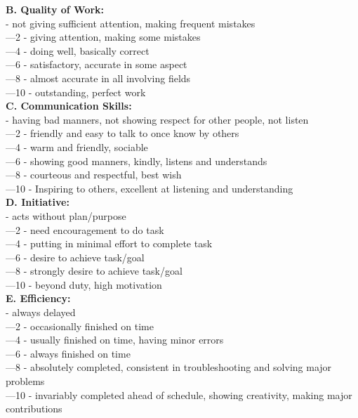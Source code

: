 \documentclass[11pt]{article}
\begin{document}
\textbf{B. Quality of Work:}\\
	\indent{}	- not giving sufficient attention, making frequent mistakes\\
	\indent{}—2	- giving attention, making some mistakes\\
	\indent{}—4	- doing well, basically correct\\
	\indent{}—6	- satisfactory, accurate in some aspect\\
	\indent{}—8	- almost accurate in all involving fields\\
	\indent{}—10	- outstanding, perfect work\\

\textbf{C. Communication Skills:}\\
	\indent{}	- having bad manners, not showing respect for other people, not listen\\
	\indent{}—2	- friendly and easy to talk to once know by others\\
	\indent{}—4	- warm and friendly, sociable\\
	\indent{}—6	- showing good manners, kindly, listens and understands\\
	\indent{}—8	- courteous and respectful, best wish\\ 
	\indent{}—10	- Inspiring to others, excellent at listening and understanding\\

\textbf{D. Initiative:}\\
	\indent{}	- acts without plan/purpose\\
	\indent{}—2	- need encouragement to do task\\
	\indent{}—4	- putting in minimal effort to complete task\\
	\indent{}—6	- desire to achieve task/goal\\
	\indent{}—8	- strongly desire to achieve task/goal\\
	\indent{}—10	- beyond duty, high motivation\\

\textbf{E. Efficiency:}\\
	\indent{}	- always delayed\\
	\indent{}—2	- occasionally finished on time\\  
	\indent{}—4	- usually finished on time, having minor errors\\
	\indent{}—6	- always finished on time\\
	\indent{}—8	- absolutely completed, consistent in troubleshooting and solving major problems\\ 
	\indent{}—10	- invariably completed ahead of schedule, showing creativity, making major contributions\\ 
\end{document}
